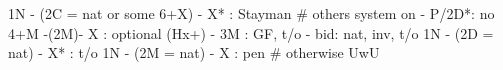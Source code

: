 1N - (2C = nat or some 6+X) - X* : Stayman  # others system on
   - P/2D*: no 4+M
          -(2M)- X  : optional (Hx+)
               - 3M : GF, t/o
               - bid: nat, inv, t/o
1N - (2D = nat) - X* : t/o
1N - (2M = nat) - X  : pen
# otherwise UwU